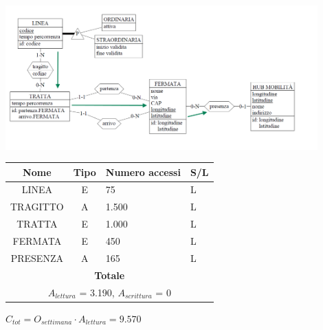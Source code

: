 \documentclass[12pt,a4paper]{report}
\begin{document}
\begin{enumerate}[label=\textbf{\arabic*}]
    \begin{center}
    \includegraphics[width=0.9\textwidth]{VisualLineeMaggiorHub}
    \end{center}
    \begin{table}[H]
    \centering
    \begin{tabular}{|c|c|l|l|}
    \hline
    \textbf{Nome} & \textbf{Tipo} & \textbf{Numero accessi} & \textbf{S/L} \\
    \hline
    LINEA & E & 75 & L \\
    \hline
    TRAGITTO & A & 1.500 & L \\
    \hline
    TRATTA & E & 1.000 & L \\
    \hline
    FERMATA & E & 450 & L \\
    \hline
    PRESENZA & A & 165 & L \\
    \hline
    \multicolumn{4}{c}{\textbf{Totale}} \\
    \multicolumn{4}{c}{${A_{lettura}}$ = 3.190, ${A_{scrittura}}$ = 0} \\
    \hline
    \end{tabular}
    \end{table}
    \begin{center}
    ${C_{tot} = {O_{settimana}}\cdot{A_{lettura}}= 9.570}$
    \end{center}



\end{enumerate}
\end{document}
